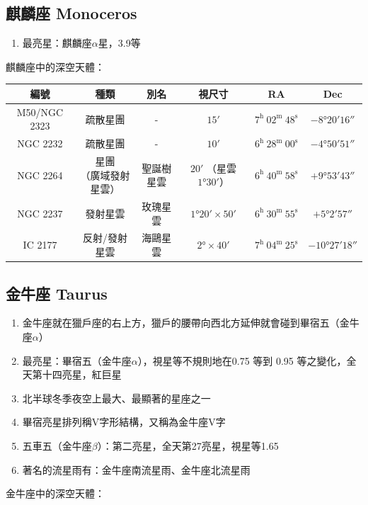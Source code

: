 \subsection{麒麟座 Monoceros}
\begin{enumerate}
    \item 最亮星：麒麟座\(\alpha\)星，3.9等
\end{enumerate}
麒麟座中的深空天體：

\begin{center}
\begin{longtable}{c | c | c | c | c | c}
    編號 & 種類 & 別名 & 視尺寸 & RA & Dec \\
    \hline
    \endfirsthead


    \endfoot

    \endlastfoot

    M50/NGC 2323 & 疏散星團 & - & \(\ang{;15;}\) & \(7^\text{h }02^\text{m }48^\text{s}\) & \(-\ang{8;20;16}\) \\
    NGC 2232 & 疏散星團 & - & \(\ang{;10;}\) & \(6^\text{h }28^\text{m }00^\text{s}\) & \(-\ang{4;50;51}\) \\
    NGC 2264 & \makecell{星團\\（廣域發射星雲）} & 聖誕樹星雲 & \makecell{\(\ang{;20;}\)\\（星雲\(\ang{1;30;}\)）} & \(6^\text{h }40^\text{m }58^\text{s}\) & \(+\ang{9;53;43}\) \\
    NGC 2237 & 發射星雲 & 玫瑰星雲 & \(\ang{1;20;}\times\ang{;50;}\) & \(6^\text{h }30^\text{m }55^\text{s}\) & \(+\ang{5;2;57}\) \\
    IC 2177 & 反射/發射星雲 & 海鷗星雲 & \(\ang{2;;}\times\ang{;40;}\) & \(7^\text{h }04^\text{m }25^\text{s}\) & \(-\ang{10;27;18}\)
\end{longtable}
\end{center}

\subsection{金牛座 Taurus}
\begin{enumerate}
    \item 金牛座就在獵戶座的右上方，獵戶的腰帶向西北方延伸就會碰到畢宿五（金牛座\(\alpha\)）
    \item 最亮星：畢宿五（金牛座\(\alpha\)），視星等不規則地在0.75 等到 0.95 等之變化，全天第十四亮星，紅巨星
    \item 北半球冬季夜空上最大、最顯著的星座之一
    \item 畢宿亮星排列稱V字形結構，又稱為金牛座V字
    \item 五車五（金牛座\(\beta\)）：第二亮星，全天第27亮星，視星等1.65
    \item 著名的流星雨有：金牛座南流星雨、金牛座北流星雨
\end{enumerate}
金牛座中的深空天體：

